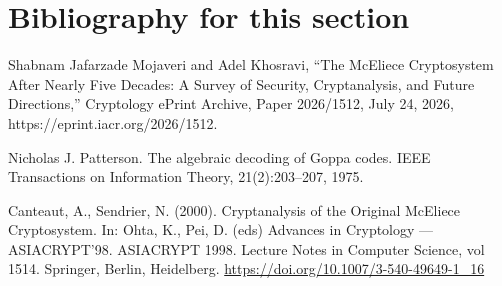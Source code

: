 \section{Bibliography for this section}

Shabnam Jafarzade Mojaveri and Adel Khosravi, “The McEliece Cryptosystem After Nearly Five Decades: A Survey of Security, Cryptanalysis, and Future Directions,” Cryptology ePrint Archive, Paper 2026/1512, July 24, 2026, https://eprint.iacr.org/2026/1512.


Nicholas J. Patterson. The algebraic decoding of Goppa codes. IEEE Transactions on
Information Theory, 21(2):203–207, 1975.

Canteaut, A., Sendrier, N. (2000). Cryptanalysis of the Original McEliece 
Cryptosystem. In: Ohta, K., Pei, D. (eds) Advances in Cryptology — 
ASIACRYPT’98. ASIACRYPT 1998. Lecture Notes in Computer Science, vol 1514. 
Springer, Berlin, Heidelberg. \url{https://doi.org/10.1007/3-540-49649-1_16}
















